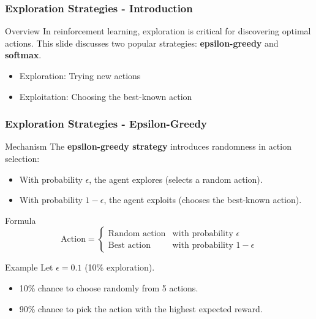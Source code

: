 \documentclass[aspectratio=169]{beamer}
\begin{document}
\begin{frame}[fragile]
    \frametitle{Exploration Strategies - Introduction}
    \begin{block}{Overview}
        In reinforcement learning, exploration is critical for discovering optimal actions. 
        This slide discusses two popular strategies: 
        \textbf{epsilon-greedy} and \textbf{softmax}.
    \end{block}
    \begin{itemize}
        \item Exploration: Trying new actions
        \item Exploitation: Choosing the best-known action
    \end{itemize}
\end{frame}

\begin{frame}[fragile]
    \frametitle{Exploration Strategies - Epsilon-Greedy}
    \begin{block}{Mechanism}
        The \textbf{epsilon-greedy strategy} introduces randomness in action selection:
        \begin{itemize}
            \item With probability $\epsilon$, the agent explores (selects a random action).
            \item With probability $1 - \epsilon$, the agent exploits (chooses the best-known action).
        \end{itemize}
    \end{block}
    \begin{block}{Formula}
        \begin{equation}
            \text{Action} = 
            \begin{cases} 
            \text{Random action} & \text{with probability } \epsilon \\
            \text{Best action} & \text{with probability } 1 - \epsilon 
            \end{cases}
        \end{equation}
    \end{block}
    \begin{block}{Example}
        Let $\epsilon = 0.1$ (10\% exploration).
        \begin{itemize}
            \item 10\% chance to choose randomly from 5 actions.
            \item 90\% chance to pick the action with the highest expected reward.
        \end{itemize}
    \end{block}
\end{frame}
\end{document}
